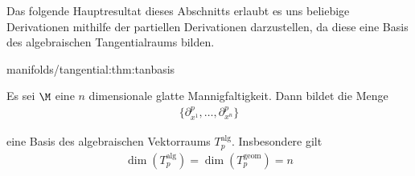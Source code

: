 \documentclass[letterpaper,10pt,german]{jupyterBook}
\begin{document}
\par
Das folgende Hauptresultat dieses Abschnitts erlaubt es uns beliebige Derivationen mithilfe der partiellen Derivationen darzustellen, da diese eine Basis des algebraischen Tangentialraums bilden.
\begin{theorem}{}{manifolds/tangential:thm:tanbasis}



\par
Es sei \(\M\) eine \(n\) dimensionale glatte Mannigfaltigkeit.
Dann bildet die Menge
\begin{align*}
\{\partial_{x^1}^p,\ldots,\partial_{x^n}^p\}
\end{align*}
\par
eine Basis des algebraischen Vektorraums \(T^{\text{alg}}_p\).
Insbesondere gilt
\begin{align*}
\dim(T^{\text{alg}}_p)=\dim(T^{\text{geom}}_p)=n
\end{align*}\end{theorem}
\end{document}
